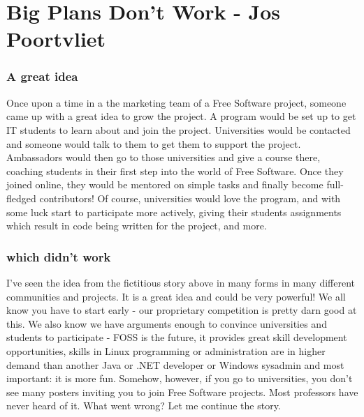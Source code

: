 \chapter{Big Plans Don't Work - Jos Poortvliet}
\subsection*{A great idea}
Once upon a time in a the marketing team of a Free Software project, someone came up with a great idea to grow the project. A program would be set up to get IT students to learn about and join the project. Universities would be contacted and someone would talk to them to get them to support the project. Ambassadors would then go to those universities and give a course there, coaching students in their first step into the world of Free Software. Once they joined online, they would be mentored on simple tasks and finally become full-fledged contributors! Of course, universities would love the program, and with some luck start to participate more actively, giving their students assignments which result in code being written for the project, and more.

\subsection*{which didn't work}
I've seen the idea from the fictitious story above in many forms in many different communities and projects. It is a great idea and could be very powerful! We all know you have to start early - our proprietary competition is pretty darn good at this. We also know we have arguments enough to convince universities and students to participate - FOSS is the future, it provides great skill development opportunities, skills in Linux programming or administration are in higher demand than another Java or .NET developer or Windows sysadmin and most important: it is more fun. Somehow, however, if you go to universities, you don't see many posters inviting you to join Free Software projects. Most professors have never heard of it. What went wrong? Let me continue the story.

